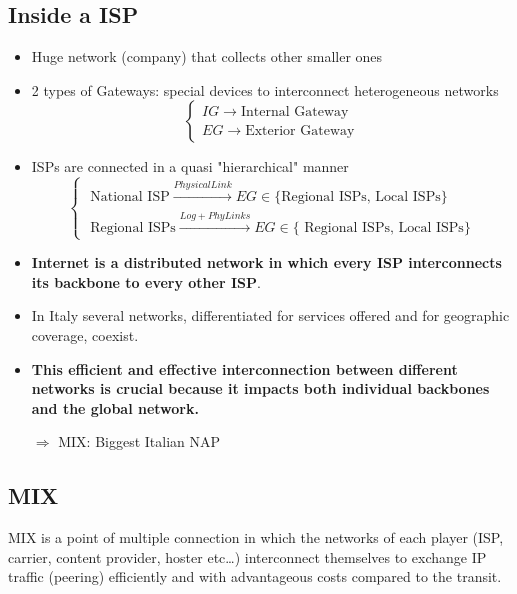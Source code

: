 \subsection{Inside a ISP}
\begin{itemize}
\item Huge network (company) that collects other smaller ones
\item 2 types of Gateways: special devices to interconnect heterogeneous networks
\begin{equation}
\begin{cases}
IG \rightarrow \text{Internal Gateway}\\
EG \rightarrow \text{Exterior Gateway}
\end{cases}
\end{equation}

\item ISPs are connected in a quasi "hierarchical" manner
\begin{equation}
\begin{cases}
\text{ National ISP} \stackrel{Physical Link}{\longrightarrow} EG \in \text{$\{$Regional ISPs, Local ISPs$\}$}\\
\text{ Regional ISPs} \stackrel{Log + Phy Links}{\longrightarrow} EG \in \text{$\{$ Regional ISPs, Local ISPs$\}$}
\end{cases}
\end{equation}

\item \textbf{Internet is a distributed network in which every ISP interconnects
its backbone to every other ISP}.

\item In Italy several networks, differentiated for services offered and
for geographic coverage, coexist.

\item \textbf{This efficient and effective interconnection between different networks is crucial because it impacts both individual backbones and the global network.}

$\Rightarrow$ MIX: Biggest Italian NAP 
\end{itemize}

\subsection{MIX}
MIX is a point of multiple connection in which the networks of each player (ISP, carrier, content provider, hoster etc…) interconnect themselves to exchange IP traffic (peering) efficiently and with advantageous costs compared to the transit.

